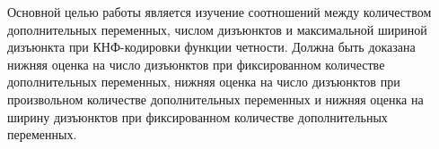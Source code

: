 
Основной целью работы является изучение соотношений между количеством дополнительных переменных, числом дизъюнктов и максимальной шириной дизъюнкта при КНФ-кодировки функции четности. Должна быть доказана нижняя оценка на число дизъюнктов при фиксированном количестве дополнительных переменных, нижняя оценка на число дизъюнктов при произвольном количестве дополнительных переменных и нижняя оценка на ширину дизъюнктов при фиксированном количестве дополнительных переменных. 